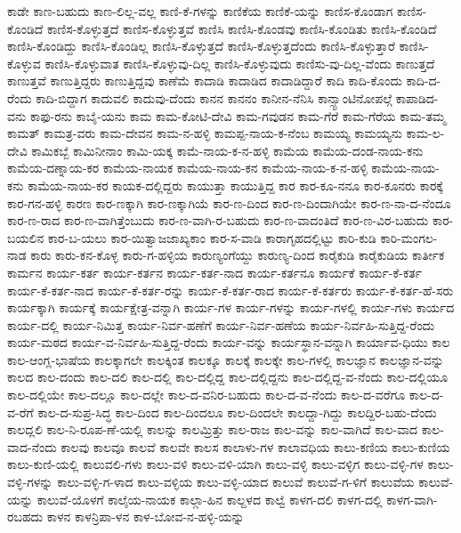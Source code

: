 {ಕಾಡೇ
ಕಾಣ-ಬಹುದು
ಕಾಣ-ಲಿಲ್ಲ-ವಲ್ಲ
ಕಾಣಿ-ಕೆ-ಗಳನ್ನು
ಕಾಣಿಕೆಯ
ಕಾಣಿಕೆ-ಯನ್ನು
ಕಾಣಿಸ-ಕೊಂಡಾಗ
ಕಾಣಿಸ-ಕೊಂಡಿದೆ
ಕಾಣಿಸ-ಕೊಳ್ಳುತ್ತದೆ
ಕಾಣಿಸ-ಕೊಳ್ಳುತ್ತವೆ
ಕಾಣಿಸಿ
ಕಾಣಿಸಿ-ಕೊಂಡವು
ಕಾಣಿಸಿ-ಕೊಂಡಿತು
ಕಾಣಿಸಿ-ಕೊಂಡಿದೆ
ಕಾಣಿಸಿ-ಕೊಂಡಿದ್ದು
ಕಾಣಿಸಿ-ಕೊಂಡಿಲ್ಲ
ಕಾಣಿಸಿ-ಕೊಳ್ಳುತ್ತದೆ
ಕಾಣಿಸಿ-ಕೊಳ್ಳುತ್ತದೆಂದು
ಕಾಣಿಸಿ-ಕೊಳ್ಳುತ್ತಾರೆ
ಕಾಣಿಸಿ-ಕೊಳ್ಳುವ
ಕಾಣಿಸಿ-ಕೊಳ್ಳುವಾತ
ಕಾಣಿಸಿ-ಕೊಳ್ಳುವು-ದಿಲ್ಲ
ಕಾಣಿಸಿ-ಕೊಳ್ಳುವುದು
ಕಾಣಿಸು-ವು-ದಿಲ್ಲ-ವೆಂದು
ಕಾಣುತ್ತದೆ
ಕಾಣುತ್ತವೆ
ಕಾಣುತ್ತಿದ್ದರು
ಕಾಣುತ್ತಿದ್ದವು
ಕಾಣೆಮೆ
ಕಾದಾಡಿ
ಕಾದಾಡಿದ
ಕಾದಾಡಿದ್ದಾರೆ
ಕಾದಿ
ಕಾದಿ-ಕೊಂದು
ಕಾದಿ-ದ-ರೆಂದು
ಕಾದಿ-ಬಿದ್ದಾಗ
ಕಾದುವಲಿ
ಕಾದುವು-ದೆಂದು
ಕಾನನ
ಕಾನನಂ
ಕಾನೀನ-ನೆನಿಸಿ
ಕಾನ್ಸ್ಟಾಂಟಿನೋಪಲ್ಗೆ
ಕಾಪಾಡಿದ-ವನು
ಕಾಫು-ರನು
ಕಾಬೈ-ಯನು
ಕಾಮ
ಕಾಮ-ಕೋಟಿ-ದೇವಿ
ಕಾಮ-ಗವುಡನ
ಕಾಮ-ಗೆರೆ
ಕಾಮ-ಗೆರೆಯ
ಕಾಮ-ತಮ್ಮ
ಕಾಮತ್
ಕಾಮತ್ರ-ವರು
ಕಾಮ-ದೇವನ
ಕಾಮ-ನ-ಹಳ್ಳಿ
ಕಾಮಪ್ಪ-ನಾಯ-ಕ-ನೆಂಬ
ಕಾಮಯ್ಯ
ಕಾಮಯ್ಯನು
ಕಾಮ-ಲ-ದೇವಿ
ಕಾಮಿಕಬ್ಬೆ
ಕಾಮಿನೀನಾಂ
ಕಾಮಿ-ಯಕ್ಕ
ಕಾಮೆ-ನಾಯ-ಕ-ನ-ಹಳ್ಳಿ
ಕಾಮೆಯ
ಕಾಮೆಯ-ದಂಡ-ನಾಯ-ಕನು
ಕಾಮೆಯ-ದಣ್ನಾಯ-ಕರ
ಕಾಮೆಯ-ನಾಯಕ
ಕಾಮೆಯ-ನಾಯ-ಕನ
ಕಾಮೆಯ-ನಾಯ-ಕ-ನ-ಹಳ್ಳಿ
ಕಾಮೆಯ-ನಾಯ-ಕನು
ಕಾಮೆಯ-ನಾಯ-ಕರ
ಕಾಯಕ-ದಲ್ಲಿದ್ದರು
ಕಾಯುತ್ತಾ
ಕಾಯುತ್ತಿದ್ದ
ಕಾರ
ಕಾರ-ಕೂ-ನನೂ
ಕಾರ-ಕೂನರು
ಕಾರಕ್ಕೆ
ಕಾರ-ಗನ-ಹಳ್ಳಿ
ಕಾರಣ
ಕಾರ-ಣಕ್ಕಾಗಿ
ಕಾರ-ಣಕ್ಕಾಗಿಯೆ
ಕಾರ-ಣ-ದಿಂದ
ಕಾರ-ಣ-ದಿಂದಾಗಿಯೇ
ಕಾರ-ಣ-ನಾ-ದ-ನೆಂದೂ
ಕಾರ-ಣ-ರಾದ
ಕಾರ-ಣ-ವಾಗಿತ್ತೆಂಬುದು
ಕಾರ-ಣ-ವಾಗಿ-ರ-ಬಹುದು
ಕಾರ-ಣ-ವಾದಂತಿದೆ
ಕಾರ-ಣ-ವಿರ-ಬಹುದು
ಕಾರ-ಬಯಲಿನ
ಕಾರ-ಬ-ಯಲು
ಕಾರ-ಯಿತ್ವಾಜಜಾಖ್ಯಕಾಂ
ಕಾರ-ಸ-ವಾಡಿ
ಕಾರಾಗೃಹದಲ್ಲಿಟ್ಟು
ಕಾರಿ-ಕುಡಿ
ಕಾರಿ-ಮಂಗಲ-ನಾಡ
ಕಾರು
ಕಾರು-ಕನ-ಕೊಳ್ಳ
ಕಾರು-ಗ-ಹಳ್ಳಿಯ
ಕಾರುಣ್ಯಂಗೆಯ್ದು
ಕಾರುಣ್ಯ-ದಿಂದ
ಕಾರೈಕುಡಿ
ಕಾರೈಕುಡಿಯ
ಕಾರ್ತೀಕ
ಕಾರ್ಮನ
ಕಾರ್ಯ-ಕರ್ತ
ಕಾರ್ಯ-ಕರ್ತನ
ಕಾರ್ಯ-ಕರ್ತ-ನಾದ
ಕಾರ್ಯ-ಕರ್ತನೂ
ಕಾರ್ಯಕೆ
ಕಾರ್ಯ-ಕೆ-ಕರ್ತ
ಕಾರ್ಯ-ಕೆ-ಕರ್ತ-ನಾದ
ಕಾರ್ಯ-ಕೆ-ಕರ್ತ-ರನ್ನು
ಕಾರ್ಯ-ಕೆ-ಕರ್ತ-ರಾದ
ಕಾರ್ಯ-ಕೆ-ಕರ್ತರು
ಕಾರ್ಯ-ಕೆ-ಕರ್ತ-ಹೆ-ಸರು
ಕಾರ್ಯಕ್ಕಾಗಿ
ಕಾರ್ಯಕ್ಕೆ
ಕಾರ್ಯಕ್ಷೇತ್ರ-ವನ್ನಾಗಿ
ಕಾರ್ಯ-ಗಳ
ಕಾರ್ಯ-ಗಳನ್ನು
ಕಾರ್ಯ-ಗಳಲ್ಲಿ
ಕಾರ್ಯ-ಗಳು
ಕಾರ್ಯದ
ಕಾರ್ಯ-ದಲ್ಲಿ
ಕಾರ್ಯ-ನಿಮಿತ್ತ
ಕಾರ್ಯ-ನಿರ್ವ-ಹಣೆಗೆ
ಕಾರ್ಯ-ನಿರ್ವ-ಹಣೆಯ
ಕಾರ್ಯ-ನಿರ್ವಹಿ-ಸುತ್ತಿದ್ದ-ರೆಂದು
ಕಾರ್ಯ-ಮಠದ
ಕಾರ್ಯ-ವ-ನಿರ್ವಹಿ-ಸುತ್ತಿದ್ದ-ರೆಂದು
ಕಾರ್ಯ-ವನ್ನು
ಕಾರ್ಯಸ್ಥಾನ-ವನ್ನಾಗಿ
ಕಾರ್ಯಾವ-ಧಿಯು
ಕಾಲ
ಕಾಲ-ಆಂಗ್ಲ-ಭಾಷೆಯ
ಕಾಲಕ್ಕಾಗಲೇ
ಕಾಲಕ್ಕಿಂತ
ಕಾಲಕ್ಕೂ
ಕಾಲಕ್ಕೆ
ಕಾಲಕ್ಕೇ
ಕಾಲ-ಗಳಲ್ಲಿ
ಕಾಲಜ್ಞಾನ
ಕಾಲಜ್ಞಾನ-ವನ್ನು
ಕಾಲದ
ಕಾಲ-ದಂದು
ಕಾಲ-ದಲಿ
ಕಾಲ-ದಲ್ಲಿ
ಕಾಲ-ದಲ್ಲಿದ್ದ
ಕಾಲ-ದಲ್ಲಿದ್ದನು
ಕಾಲ-ದಲ್ಲಿದ್ದ-ವ-ನೆಂದು
ಕಾಲ-ದಲ್ಲಿಯೂ
ಕಾಲ-ದಲ್ಲಿಯೇ
ಕಾಲ-ದಲ್ಲೂ
ಕಾಲ-ದಲ್ಲೇ
ಕಾಲ-ದ-ವನಿರ-ಬಹುದು
ಕಾಲ-ದ-ವ-ನೆಂದು
ಕಾಲ-ದ-ವರೆಗೂ
ಕಾಲ-ದ-ವ-ರೆಗೆ
ಕಾಲ-ದ-ಸುಪ್ರ-ಸಿದ್ಧ
ಕಾಲ-ದಿಂದ
ಕಾಲ-ದಿಂದಲೂ
ಕಾಲ-ದಿಂದಲೇ
ಕಾಲದ್ದಾ-ಗಿದ್ದು
ಕಾಲದ್ದಿರ-ಬಹು-ದೆಂದು
ಕಾಲದ್ಲಲಿ
ಕಾಲ-ನಿ-ರೂಪ-ಣೆ-ಯಲ್ಲಿ
ಕಾಲನ್ನು
ಕಾಲಮ್ರಿತ್ತು
ಕಾಲ-ರಾಜ
ಕಾಲ-ವನ್ನು
ಕಾಲ-ವಾಗಿದೆ
ಕಾಲ-ವಾದ
ಕಾಲ-ವಾದ-ನೆಂದು
ಕಾಲವು
ಕಾಲವೂ
ಕಾಲವೆ
ಕಾಲವೇ
ಕಾಲಸ
ಕಾಲಾಳು-ಗಳ
ಕಾಲಾವಧಿಯ
ಕಾಲು-ಕಣಿಯ
ಕಾಲು-ಕುಣಿಯ
ಕಾಲು-ಕುಣಿ-ಯಲ್ಲಿ
ಕಾಲುವಲಿ-ಗಳು
ಕಾಲು-ವಳಿ
ಕಾಲು-ವಳಿ-ಯಾಗಿ
ಕಾಲು-ವಳ್ಳಿ
ಕಾಲು-ವಳ್ಳಿಗ
ಕಾಲು-ವಳ್ಳಿ-ಗಳ
ಕಾಲು-ವಳ್ಳಿ-ಗಳನ್ನು
ಕಾಲು-ವಳ್ಳಿ-ಗ-ಳಾದ
ಕಾಲು-ವಳ್ಳಿಯ
ಕಾಲು-ವಳ್ಳಿ-ಯಾದ
ಕಾಲುವೆ
ಕಾಲುವೆ-ಗ-ಳಿಗೆ
ಕಾಲುವೆಯ
ಕಾಲುವೆ-ಯನ್ನು
ಕಾಲುವೆ-ಯೊಳಗೆ
ಕಾಲೈಯ-ನಾಯಕ
ಕಾಲ್ಗಾ-ಹಿನ
ಕಾಲ್ದಳದ
ಕಾಲ್ವೆ
ಕಾಳಗ-ದಲಿ
ಕಾಳಗ-ದಲ್ಲಿ
ಕಾಳಗ-ವಾಗಿ-ರಬಹದು
ಕಾಳನ
ಕಾಳನ್ರಿಪಾ-ಳನ
ಕಾಳ-ಬೋವ-ನ-ಹಳ್ಳಿ-ಯನ್ನು
}
